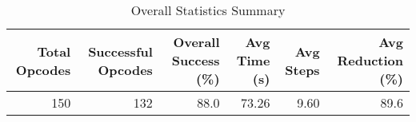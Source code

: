 \begin{table}[htbp]
\centering
\caption{Overall Statistics Summary}
\label{tab:step3_overall_statistics}
\begin{tabular}{rrrrrr}
\toprule
Total Opcodes & Successful Opcodes & Overall Success (\%) & Avg Time (s) & Avg Steps & Avg Reduction (\%) \\
\midrule
150 & 132 & 88.0 & 73.26 & 9.60 & 89.6 \\
\bottomrule
\end{tabular}
\end{table}